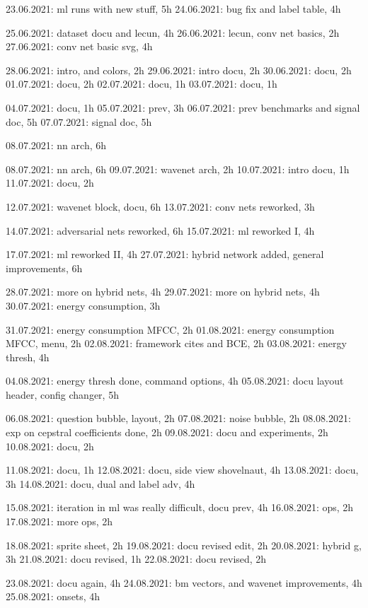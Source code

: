 23.06.2021: ml runs with new stuff, 5h
24.06.2021: bug fix and label table, 4h

25.06.2021: dataset docu and lecun, 4h
26.06.2021: lecun, conv net basics, 2h
27.06.2021: conv net basic svg, 4h

28.06.2021: intro, and colors, 2h
29.06.2021: intro docu, 2h
30.06.2021: docu, 2h
01.07.2021: docu, 2h
02.07.2021: docu, 1h
03.07.2021: docu, 1h

04.07.2021: docu, 1h
05.07.2021: prev, 3h
06.07.2021: prev benchmarks and signal doc, 5h 
07.07.2021: signal doc, 5h

08.07.2021: nn arch, 6h

08.07.2021: nn arch, 6h
09.07.2021: wavenet arch, 2h
10.07.2021: intro docu, 1h
11.07.2021: docu, 2h

12.07.2021: wavenet block, docu, 6h
13.07.2021: conv nets reworked, 3h

14.07.2021: adversarial nets reworked, 6h
15.07.2021: ml reworked I, 4h

17.07.2021: ml reworked II, 4h
27.07.2021: hybrid network added, general improvements, 6h

28.07.2021: more on hybrid nets, 4h
29.07.2021: more on hybrid nets, 4h
30.07.2021: energy consumption, 3h

31.07.2021: energy consumption MFCC, 2h
01.08.2021: energy consumption MFCC, menu, 2h
02.08.2021: framework cites and BCE, 2h
03.08.2021: energy thresh, 4h

04.08.2021: energy thresh done, command options, 4h
05.08.2021: docu layout header, config changer, 5h

06.08.2021: question bubble, layout, 2h
07.08.2021: noise bubble, 2h
08.08.2021: exp on cepstral coefficients done, 2h
09.08.2021: docu and experiments, 2h
10.08.2021: docu, 2h

11.08.2021: docu, 1h
12.08.2021: docu, side view shovelnaut, 4h
13.08.2021: docu, 3h
14.08.2021: docu, dual and label adv, 4h

15.08.2021: iteration in ml was really difficult, docu prev, 4h
16.08.2021: ops, 2h
17.08.2021: more ops, 2h

18.08.2021: sprite sheet, 2h
19.08.2021: docu revised edit, 2h
20.08.2021: hybrid g, 3h
21.08.2021: docu revised, 1h
22.08.2021: docu revised, 2h

23.08.2021: docu again, 4h
24.08.2021: bm vectors, and wavenet improvements, 4h
25.08.2021: onsets, 4h


